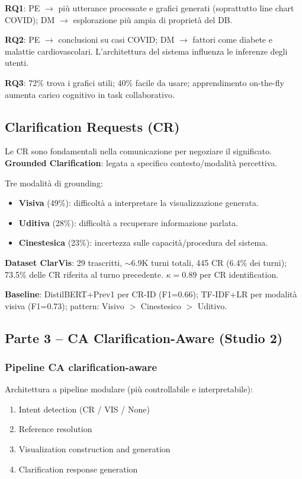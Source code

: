 \documentclass[a4paper,12pt]{article}
\begin{document}
\textbf{RQ1}: PE $\to$ pi\`u utterance processate e grafici generati (soprattutto line chart COVID); DM $\to$ esplorazione pi\`u ampia di propriet\`a del DB.

\textbf{RQ2}: PE $\to$ conclusioni su casi COVID; DM $\to$ fattori come diabete e malattie cardiovascolari. L'architettura del sistema influenza le inferenze degli utenti.

\textbf{RQ3}: 72\% trova i grafici utili; 40\% facile da usare; apprendimento on-the-fly aumenta carico cognitivo in task collaborativo.

\subsection{Clarification Requests (CR)}
Le CR sono fondamentali nella comunicazione per negoziare il significato. \textbf{Grounded Clarification}: legata a specifico contesto/modalit\`a percettiva.

Tre modalit\`a di grounding:
\begin{itemize}
    \item \textbf{Visiva} (49\%): difficolt\`a a interpretare la visualizzazione generata.
    \item \textbf{Uditiva} (28\%): difficolt\`a a recuperare informazione parlata.
    \item \textbf{Cinestesica} (23\%): incertezza sulle capacit\`a/procedura del sistema.
\end{itemize}

\textbf{Dataset ClarVis}: 29 trascritti, $\sim$6.9K turni totali, 445 CR (6.4\% dei turni); 73.5\% delle CR riferita al turno precedente. $\kappa = 0.89$ per CR identification.

\textbf{Baseline}: DistilBERT+Prev1 per CR-ID (F1=0.66); TF-IDF+LR per modalit\`a visiva (F1=0.73); pattern: Visivo $>$ Cinestesico $>$ Uditivo.

\subsection{Parte 3 -- CA Clarification-Aware (Studio 2)}

\subsubsection{Pipeline CA clarification-aware}
Architettura a pipeline modulare (pi\`u controllabile e interpretabile):
\begin{enumerate}
    \item Intent detection (CR / VIS / None)
    \item Reference resolution
    \item Visualization construction and generation
    \item Clarification response generation
\end{enumerate}
\end{document}
